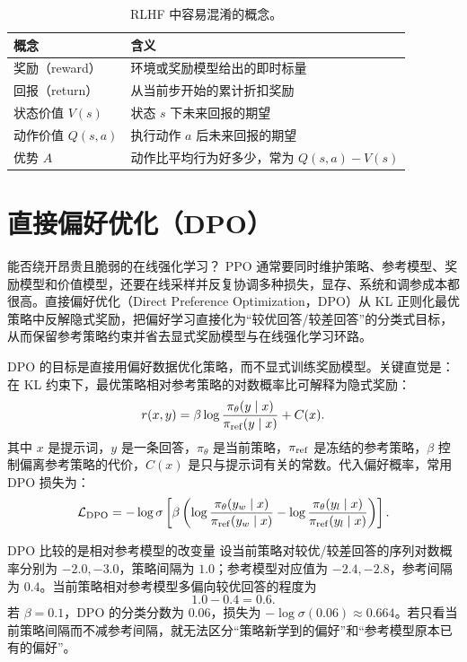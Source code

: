 \begin{table}[htbp]
\centering
\small
\begin{tabularx}{0.9\textwidth}{lY}
\toprule
概念 & 含义\\
\midrule
奖励（reward） & 环境或奖励模型给出的即时标量\\
回报（return） & 从当前步开始的累计折扣奖励\\
状态价值 $V(s)$ & 状态 $s$ 下未来回报的期望\\
动作价值 $Q(s,a)$ & 执行动作 $a$ 后未来回报的期望\\
优势 $A$ & 动作比平均行为好多少，常为 $Q(s,a)-V(s)$\\
\bottomrule
\end{tabularx}
\caption{RLHF 中容易混淆的概念。}
\end{table}

\section{直接偏好优化（DPO）}
\label{sec:dpo}

\begin{motivationbox}{能否绕开昂贵且脆弱的在线强化学习？}
PPO 通常要同时维护策略、参考模型、奖励模型和价值模型，还要在线采样并反复协调多种损失，显存、系统和调参成本都很高。直接偏好优化（Direct Preference Optimization，DPO）从 KL 正则化最优策略中反解隐式奖励，把偏好学习直接化为“较优回答/较差回答”的分类式目标，从而保留参考策略约束并省去显式奖励模型与在线强化学习环路。
\end{motivationbox}

DPO 的目标是直接用偏好数据优化策略，而不显式训练奖励模型。关键直觉是：在 KL 约束下，最优策略相对参考策略的对数概率比可解释为隐式奖励：
\[
r(x,y)=\beta\log\frac{\pi_\theta(y\mid x)}{\pi_{\rm ref}(y\mid x)}+C(x).
\]
其中 $x$ 是提示词，$y$ 是一条回答，$\pi_\theta$ 是当前策略，$\pi_{\rm ref}$ 是冻结的参考策略，$\beta$ 控制偏离参考策略的代价，$C(x)$ 是只与提示词有关的常数。代入偏好概率，常用 DPO 损失为：
\[
\mathcal L_{\rm DPO}
=-\log\sigma\left[
\beta\left(
\log\frac{\pi_\theta(y_w\mid x)}{\pi_{\rm ref}(y_w\mid x)}
-
\log\frac{\pi_\theta(y_l\mid x)}{\pi_{\rm ref}(y_l\mid x)}
\right)\right].
\]

\begin{examplebox}{DPO 比较的是相对参考模型的改变量}
设当前策略对较优/较差回答的序列对数概率分别为 $-2.0,-3.0$，策略间隔为 $1.0$；参考模型对应值为 $-2.4,-2.8$，参考间隔为 $0.4$。当前策略相对参考模型多偏向较优回答的程度为
\[
1.0-0.4=0.6.
\]
若 $\beta=0.1$，DPO 的分类分数为 $0.06$，损失为 $-\log\sigma(0.06)\approx0.664$。若只看当前策略间隔而不减参考间隔，就无法区分“策略新学到的偏好”和“参考模型原本已有的偏好”。
\end{examplebox}

